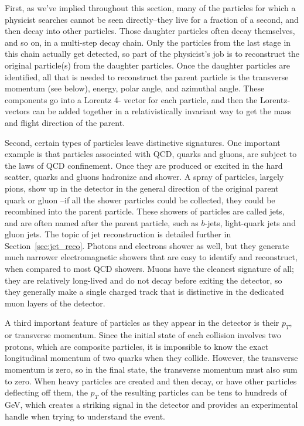 First, as we've implied throughout this section, many of the particles 
for which a physicist searches cannot be seen directly--they live for a fraction 
of a second, and then decay into other particles.  Those daughter particles often 
decay themselves, and so on, in a multi-step decay chain.  Only 
the particles from the last stage in this chain actually get detected, so part 
of the physicist's job is to reconstruct the original particle(s) 
from the daughter particles.  Once the daughter particles are identified, all that is 
needed to reconstruct the parent particle is the transverse momentum (see below), energy, 
polar angle, and azimuthal angle.  These components go into a Lorentz 4-
vector for each particle, and then the Lorentz-vectors can be added together 
in a relativistically invariant way to get the mass and flight direction of the parent.

Second, certain types of particles leave distinctive signatures.  One important example is that 
particles associated with QCD, quarks and gluons, are subject to the laws of 
QCD confinement.  Once they are produced or excited in the hard scatter, quarks 
and gluons hadronize and shower.  A spray of particles, largely pions, show 
up in the detector in the general direction of the original parent quark or gluon
--if all the shower particles could be collected, they could be recombined into 
the parent particle.  These showers of particles are called jets, and are often 
named after the parent particle, such as $b$-jets, light-quark jets 
and gluon jets.  The topic of jet reconstruction is detailed further in Section~\ref{sec:jet_reco}.  
Photons and electrons shower as well, but they generate much narrower electromagnetic showers that 
are easy to identify and reconstruct, when compared to most QCD showers.  Muons 
have the cleanest signature of all; they are relatively long-lived and do not 
decay before exiting the detector, so they generally make a single charged track that 
is distinctive in the dedicated muon layers of the detector.

A third important feature of particles as they appear in the detector is their $p_T$, 
or transverse momentum.  Since the initial state of each collision involves two protons, 
which are composite particles, it is impossible to know the exact longitudinal momentum of 
two quarks when they collide.  However, the transverse momentum is zero, so 
in the final state, the transverse momentum must also sum to zero.  When 
heavy particles are created and then decay, or have other particles deflecting off 
them, the $p_T$ of the resulting particles can be tens 
to hundreds of GeV, which creates a striking signal in the detector and provides 
an experimental handle when trying to understand the event.

